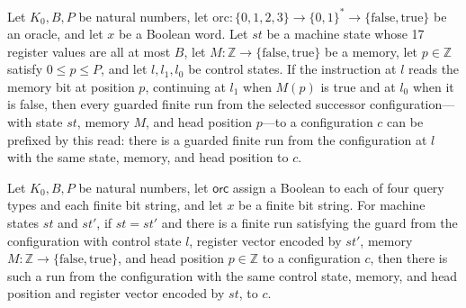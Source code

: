 \begin{lemma}
\label{Complexity.LogProg.ExpBFS.mread_of}
\leanok
{}
Let $K_0,B,P$ be natural numbers, let
$\mathrm{orc}:\{0,1,2,3\}\to\{0,1\}^*\to\{\mathrm{false},\mathrm{true}\}$ be an oracle,
and let $x$ be a Boolean word. Let $st$ be a machine state whose 17 register values are
all at most $B$, let $M:\mathbb Z\to\{\mathrm{false},\mathrm{true}\}$ be a memory, let
$p\in\mathbb Z$ satisfy $0\le p\le P$, and let $l,l_1,l_0$ be control states. If the
instruction at $l$ reads the memory bit at position $p$, continuing at $l_1$ when $M(p)$
is true and at $l_0$ when it is false, then every guarded finite run from the selected
successor configuration—with state $st$, memory $M$, and head position $p$—to a
configuration $c$ can be prefixed by this read: there is a guarded finite run from the
configuration at $l$ with the same state, memory, and head position to $c$.
\end{lemma}

\begin{lemma}
\label{Complexity.LogProg.ExpBFS.cont}
\leanok
{}
Let $K_0,B,P$ be natural numbers, let $\mathsf{orc}$ assign a Boolean to each of four
query types and each finite bit string, and let $x$ be a finite bit string. For machine
states $st$ and $st'$, if $st=st'$ and there is a finite run satisfying the guard from
the configuration with control state $l$, register vector encoded by $st'$, memory
$M:\mathbb Z\to\{\mathrm{false},\mathrm{true}\}$, and head position $p\in\mathbb Z$ to a
configuration $c$, then there is such a run from the configuration with the same control
state, memory, and head position and register vector encoded by $st$, to $c$.
\end{lemma}

